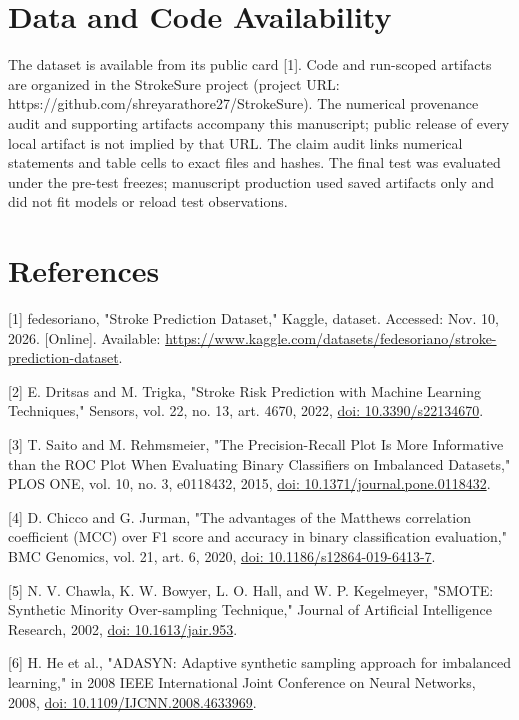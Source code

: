 \documentclass[10pt,twocolumn,letterpaper]{article}
\begin{document}
\section*{Data and Code Availability}
The dataset is available from its public card [1]. Code and run-scoped artifacts are organized in the StrokeSure project (project URL: https://github.com/shreyarathore27/StrokeSure). The numerical provenance audit and supporting artifacts accompany this manuscript; public release of every local artifact is not implied by that URL. The claim audit links numerical statements and table cells to exact files and hashes. The final test was evaluated under the pre-test freezes; manuscript production used saved artifacts only and did not fit models or reload test observations.


\section*{References}
[1] fedesoriano, "Stroke Prediction Dataset," Kaggle, dataset. Accessed: Nov. 10, 2026. [Online]. Available: \href{https://www.kaggle.com/datasets/fedesoriano/stroke-prediction-dataset}{https://www.kaggle.com/datasets/fedesoriano/stroke-prediction-dataset}.


[2] E. Dritsas and M. Trigka, "Stroke Risk Prediction with Machine Learning Techniques," Sensors, vol. 22, no. 13, art. 4670, 2022, \href{https://doi.org/10.3390/s22134670}{doi: 10.3390/s22134670}.


[3] T. Saito and M. Rehmsmeier, "The Precision-Recall Plot Is More Informative than the ROC Plot When Evaluating Binary Classifiers on Imbalanced Datasets," PLOS ONE, vol. 10, no. 3, e0118432, 2015, \href{https://doi.org/10.1371/journal.pone.0118432}{doi: 10.1371/journal.pone.0118432}.


[4] D. Chicco and G. Jurman, "The advantages of the Matthews correlation coefficient (MCC) over F1 score and accuracy in binary classification evaluation," BMC Genomics, vol. 21, art. 6, 2020, \href{https://doi.org/10.1186/s12864-019-6413-7}{doi: 10.1186/s12864-019-6413-7}.


[5] N. V. Chawla, K. W. Bowyer, L. O. Hall, and W. P. Kegelmeyer, "SMOTE: Synthetic Minority Over-sampling Technique," Journal of Artificial Intelligence Research, 2002, \href{https://doi.org/10.1613/jair.953}{doi: 10.1613/jair.953}.


[6] H. He et al., "ADASYN: Adaptive synthetic sampling approach for imbalanced learning," in 2008 IEEE International Joint Conference on Neural Networks, 2008, \href{https://doi.org/10.1109/IJCNN.2008.4633969}{doi: 10.1109/IJCNN.2008.4633969}.
\end{document}

